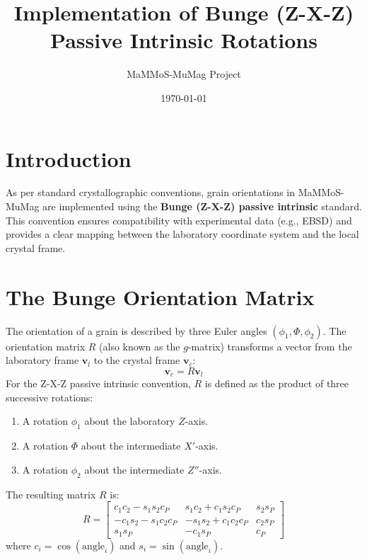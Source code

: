 \documentclass[11pt]{article}
\title{Implementation of Bunge (Z-X-Z) Passive Intrinsic Rotations}
\author{MaMMoS-MuMag Project}
\date{\today}
\begin{document}
\maketitle

\section{Introduction}
As per standard crystallographic conventions, grain orientations in MaMMoS-MuMag are implemented using the \textbf{Bunge (Z-X-Z) passive intrinsic} standard. This convention ensures compatibility with experimental data (e.g., EBSD) and provides a clear mapping between the laboratory coordinate system and the local crystal frame.

\section{The Bunge Orientation Matrix}
The orientation of a grain is described by three Euler angles $(\phi_1, \Phi, \phi_2)$. The orientation matrix $R$ (also known as the $g$-matrix) transforms a vector from the laboratory frame $\mathbf{v}_l$ to the crystal frame $\mathbf{v}_c$:
\begin{equation}
    \mathbf{v}_c = R \mathbf{v}_l
\end{equation}
For the Z-X-Z passive intrinsic convention, $R$ is defined as the product of three successive rotations:
\begin{enumerate}
    \item A rotation $\phi_1$ about the laboratory $Z$-axis.
    \item A rotation $\Phi$ about the intermediate $X'$-axis.
    \item A rotation $\phi_2$ about the intermediate $Z''$-axis.
\end{enumerate}

The resulting matrix $R$ is:
\begin{equation}
R = \begin{bmatrix} 
c_1 c_2 - s_1 s_2 c_P & s_1 c_2 + c_1 s_2 c_P & s_2 s_P \\ 
-c_1 s_2 - s_1 c_2 c_P & -s_1 s_2 + c_1 c_2 c_P & c_2 s_P \\ 
s_1 s_P & -c_1 s_P & c_P 
\end{bmatrix}
\end{equation}
where $c_i = \cos(\text{angle}_i)$ and $s_i = \sin(\text{angle}_i)$.
\end{document}
